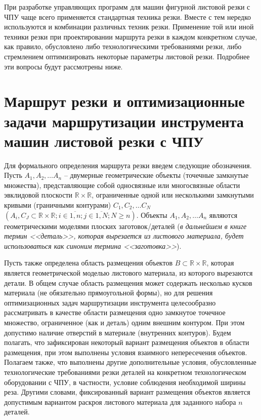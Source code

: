 \documentclass[11pt,twoside]{report}
\begin{document}
При разработке управляющих программ для
машин фигурной листовой резки с ЧПУ чаще всего
применяется стандартная техника резки.
Вместе с тем нередко используются и
комбинации различных техник резки.
Применение той или иной техники резки
при проектировании маршрута резки в
каждом конкретном случае, как правило,
обусловлено либо технологическими требованиями резки,
либо стремлением оптимизировать некоторые
параметры листовой резки.
Подробнее эти вопросы будут рассмотрены ниже.

\section{Маршрут резки и оптимизационные задачи маршрутизации инструмента машин листовой резки с ЧПУ}

Для формального определения маршрута резки
введем следующие обозначения.
Пусть
$A_1, A_2, \dots A_n$
– двумерные геометрические объекты (точечные замкнутые множества),
представляющие собой односвязные или
многосвязные области эвклидовой плоскости
$\mathbb R \times \mathbb R$,
ограниченные одной или несколькими замкнутыми кривыми
(граничными контурами)
$C_1, C_2, \dots C_N$
$(A_i, C_J \subset \mathbb R \times \mathbb R;
i \in \overline{1,n};
j \in \overline{1, N};
N \geqslant n)$.
Объекты
$A_1, A_2, \dots A_n$
являются геометрическими моделями плоских заготовок/деталей
({\it в дальнейшем в книге термин <<деталь>>,
которая вырезается из листового материала,
будет использоваться как синоним термина <<заготовка>>}).

Пусть также определена область размещения объектов
$B \subset \mathbb R \times \mathbb R$,
которая является геометрической моделью листового материала,
из которого вырезаются детали.
В общем случае область размещения
может содержать несколько кусков материала
(не обязательно прямоугольной формы),
но для решения оптимизационных задач
маршрутизации инструмента целесообразно рассматривать
в качестве области размещения одно замкнутое точечное множество,
ограниченное (как и деталь)
одним внешним контуром.
При этом допустимо наличие отверстий в материале
(внутренних контуров).
Будем полагать, что зафиксирован некоторый вариант размещения
объектов в области размещения,
при этом выполнены условия взаимного непересечения объектов.
Полагаем также, что выполнены другие дополнительные условия,
обусловленные технологические требованиями резки деталей
на конкретном технологическом оборудовании с ЧПУ,
в частности, условие соблюдения необходимой ширины реза.
Другими словами, фиксированный вариант размещения объектов
является допустимым вариантом раскроя листового материала
для заданного набора $n$ деталей.
\end{document}
